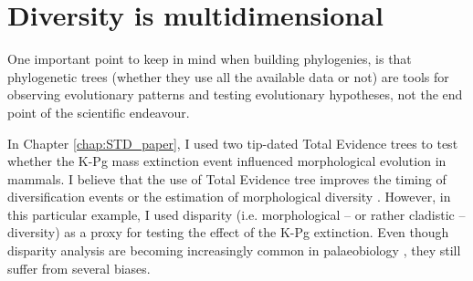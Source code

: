 \section{Diversity is multidimensional} %
One important point to keep in mind when building phylogenies, is that phylogenetic trees (whether they use all the available data or not) are tools for observing evolutionary patterns and testing evolutionary hypotheses, not the end point of the scientific endeavour.


In Chapter \ref{chap:STD_paper}, I used two tip-dated Total Evidence trees to test whether the K-Pg mass extinction event influenced morphological evolution in mammals.
I believe that the use of Total Evidence tree improves the timing of diversification events \citep[][ which is a crucial aspect when studying effect of mass extinctions which are finites points in time]{ronquista2012} or the estimation of morphological diversity \citep[increasing accuracy in reconstructing node's ancestral characters;][]{Finarelli2006}. %
However, in this particular example, I used disparity (i.e. morphological -- or rather cladistic -- diversity) as a proxy for testing the effect of the K-Pg extinction.
Even though disparity analysis are becoming increasingly common in palaeobiology \citep[e.g.]{Butler2012,brusattedinosaur2012,toljagictriassic-jurassic2013,brusattegradual2014,bensonfaunal2014,Claddis,Close2015}, they still suffer from several biases.


